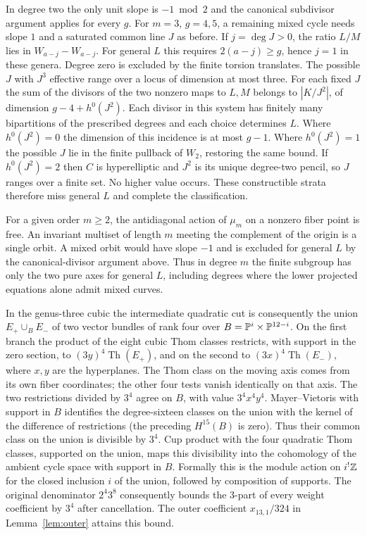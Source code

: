 In degree two the only unit slope is $-1\bmod 2$ and the canonical subdivisor argument applies for every $g$. For $m=3$, $g=4,5$, a remaining mixed cycle needs slope $1$ and a saturated common line $J$ as before. If $j=\deg J>0$, the ratio $L/M$ lies in $W_{a-j}-W_{a-j}$. For general $L$ this requires $2(a-j)\ge g$, hence $j=1$ in these genera. Degree zero is excluded by the finite torsion translates. The possible $J$ with $J^3$ effective range over a locus of dimension at most three. For each fixed $J$ the sum of the divisors of the two nonzero maps to $L,M$ belongs to $|K/J^2|$, of dimension $g-4+h^0(J^2)$. Each divisor in this system has finitely many bipartitions of the prescribed degrees and each choice determines $L$. Where $h^0(J^2)=0$ the dimension of this incidence is at most $g-1$. Where $h^0(J^2)=1$ the possible $J$ lie in the finite pullback of $W_2$, restoring the same bound. If $h^0(J^2)=2$ then $C$ is hyperelliptic and $J^2$ is its unique degree-two pencil, so $J$ ranges over a finite set. No higher value occurs. These constructible strata therefore miss general $L$ and complete the classification.

For a given order $m\ge2$, the antidiagonal action of $\mu_m$ on a
nonzero fiber point is free. An invariant multiset of length $m$
meeting the complement of the origin is a single orbit. A mixed orbit
would have slope $-1$ and is excluded for general $L$ by the
canonical-divisor argument above. Thus in degree $m$ the finite
subgroup has only the two pure axes for general $L$, including degrees
where the lower projected equations alone admit mixed curves.

In the genus-three cubic the intermediate quadratic cut is consequently
the union $E_+\cup_BE_-$ of two vector bundles of rank four over
$B=\mathbb P^i\times\mathbb P^{12-i}$. On the first branch the product of the
eight cubic Thom classes restricts, with support in the zero section,
to $(3y)^4\operatorname{Th}(E_+)$, and on the second to
$(3x)^4\operatorname{Th}(E_-)$, where $x,y$ are the hyperplanes.
The Thom class on the moving axis comes from its own fiber coordinates;
the other four tests vanish identically on that axis. The two
restrictions divided by $3^4$ agree on $B$, with value $3^4x^4y^4$.
Mayer--Vietoris with support in $B$ identifies the degree-sixteen
classes on the union with the kernel of the difference of restrictions
(the preceding $H^{15}(B)$ is zero). Thus their common class on the
union is divisible by $3^4$. Cup product with the four quadratic
Thom classes, supported on the union, maps this divisibility into the
cohomology of the ambient cycle space with support in $B$. Formally
this is the module action on $i^!\mathbb Z$ for the closed inclusion $i$ of
the union, followed by composition of supports. The original
denominator $2^4 3^8$ consequently bounds the 3-part of every weight
coefficient by $3^4$ after cancellation. The outer coefficient
$x_{13,1}/324$ in Lemma~\ref{lem:outer} attains this bound.

